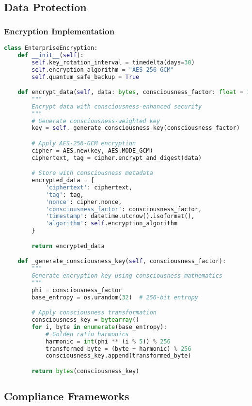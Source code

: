 \documentclass[11pt,a4paper]{article}
\begin{document}
\subsection{Data Protection}

\subsubsection{Encryption Implementation}

\begin{lstlisting}[language=Python, caption=Enterprise Encryption Framework]
class EnterpriseEncryption:
    def __init__(self):
        self.key_rotation_interval = timedelta(days=30)
        self.encryption_algorithm = "AES-256-GCM"
        self.quantum_safe_backup = True

    def encrypt_data(self, data: bytes, consciousness_factor: float = 1.618) -> dict:
        """
        Encrypt data with consciousness-enhanced security
        """
        # Generate consciousness-weighted key
        key = self._generate_consciousness_key(consciousness_factor)

        # Apply AES-256-GCM encryption
        cipher = AES.new(key, AES.MODE_GCM)
        ciphertext, tag = cipher.encrypt_and_digest(data)

        # Store with consciousness metadata
        encrypted_data = {
            'ciphertext': ciphertext,
            'tag': tag,
            'nonce': cipher.nonce,
            'consciousness_factor': consciousness_factor,
            'timestamp': datetime.utcnow().isoformat(),
            'algorithm': self.encryption_algorithm
        }

        return encrypted_data

    def _generate_consciousness_key(self, consciousness_factor):
        """
        Generate encryption key using consciousness mathematics
        """
        phi = consciousness_factor
        base_entropy = os.urandom(32)  # 256-bit entropy

        # Apply consciousness transformation
        consciousness_key = bytearray()
        for i, byte in enumerate(base_entropy):
            # Golden ratio harmonics
            harmonic = int(phi ** (i % 5)) % 256
            transformed_byte = (byte + harmonic) % 256
            consciousness_key.append(transformed_byte)

        return bytes(consciousness_key)
\end{lstlisting}

\subsection{Compliance Frameworks}
\end{document}
